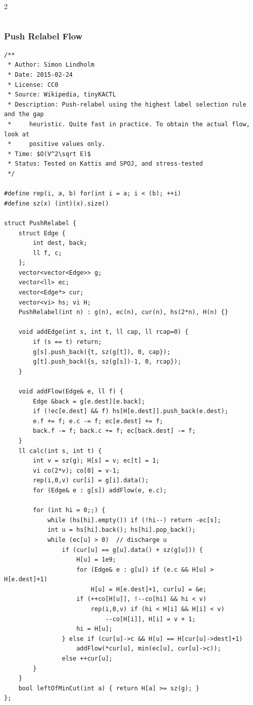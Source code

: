 \documentclass[twoside]{article}
\begin{document}
\begin{multicols*}{2}
\begin{verbatim}
\end{verbatim}

	{
		\subsubsection*{Push Relabel Flow}
	}
	\begin{verbatim}
/**
 * Author: Simon Lindholm
 * Date: 2015-02-24
 * License: CC0
 * Source: Wikipedia, tinyKACTL
 * Description: Push-relabel using the highest label selection rule and the gap
 *     heuristic. Quite fast in practice. To obtain the actual flow, look at
 *     positive values only.
 * Time: $O(V^2\sqrt E)$
 * Status: Tested on Kattis and SPOJ, and stress-tested
 */

#define rep(i, a, b) for(int i = a; i < (b); ++i)
#define sz(x) (int)(x).size()

struct PushRelabel {
	struct Edge {
		int dest, back;
		ll f, c;
	};
	vector<vector<Edge>> g;
	vector<ll> ec;
	vector<Edge*> cur;
	vector<vi> hs; vi H;
	PushRelabel(int n) : g(n), ec(n), cur(n), hs(2*n), H(n) {}

	void addEdge(int s, int t, ll cap, ll rcap=0) {
		if (s == t) return;
		g[s].push_back({t, sz(g[t]), 0, cap});
		g[t].push_back({s, sz(g[s])-1, 0, rcap});
	}

	void addFlow(Edge& e, ll f) {
		Edge &back = g[e.dest][e.back];
		if (!ec[e.dest] && f) hs[H[e.dest]].push_back(e.dest);
		e.f += f; e.c -= f; ec[e.dest] += f;
		back.f -= f; back.c += f; ec[back.dest] -= f;
	}
	ll calc(int s, int t) {
		int v = sz(g); H[s] = v; ec[t] = 1;
		vi co(2*v); co[0] = v-1;
		rep(i,0,v) cur[i] = g[i].data();
		for (Edge& e : g[s]) addFlow(e, e.c);

		for (int hi = 0;;) {
			while (hs[hi].empty()) if (!hi--) return -ec[s];
			int u = hs[hi].back(); hs[hi].pop_back();
			while (ec[u] > 0)  // discharge u
				if (cur[u] == g[u].data() + sz(g[u])) {
					H[u] = 1e9;
					for (Edge& e : g[u]) if (e.c && H[u] > H[e.dest]+1)
						H[u] = H[e.dest]+1, cur[u] = &e;
					if (++co[H[u]], !--co[hi] && hi < v)
						rep(i,0,v) if (hi < H[i] && H[i] < v)
							--co[H[i]], H[i] = v + 1;
					hi = H[u];
				} else if (cur[u]->c && H[u] == H[cur[u]->dest]+1)
					addFlow(*cur[u], min(ec[u], cur[u]->c));
				else ++cur[u];
		}
	}
	bool leftOfMinCut(int a) { return H[a] >= sz(g); }
};

\end{verbatim}


\end{multicols*}
\end{document}
